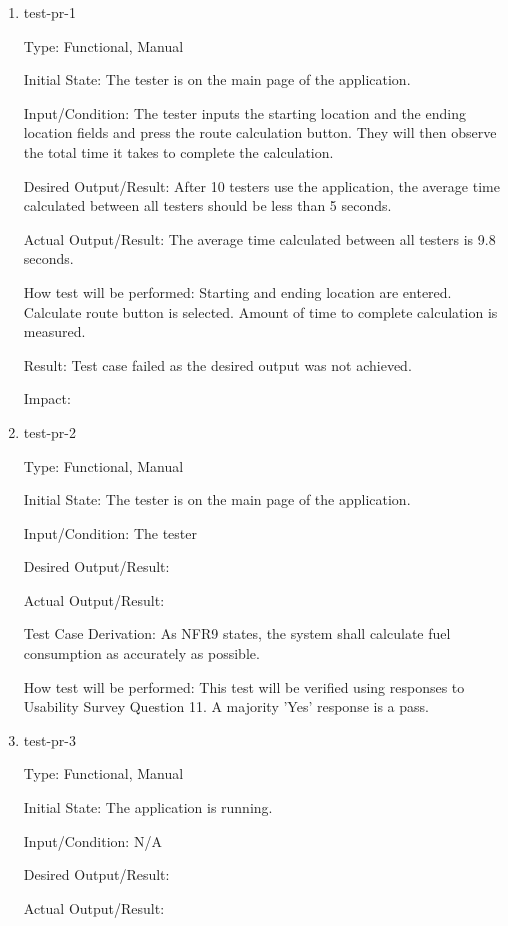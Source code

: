 \documentclass[12pt, titlepage]{article}
\begin{document}
\begin{enumerate}

\item{test-pr-1\\}

Type: Functional, Manual

Initial State: The tester is on the main page of the application.

Input/Condition: The tester inputs the starting location and the ending location fields and press the route calculation button. They will then observe the total time it takes to complete the calculation.

Desired Output/Result: After 10 testers use the application, the average time calculated between all testers should be less than 5 seconds.

Actual Output/Result: The average time calculated between all testers is 9.8 seconds.

How test will be performed: Starting and ending location are entered. Calculate route button is selected. Amount of time to complete calculation is measured. 

Result: Test case failed as the desired output was not achieved.

Impact: 

\item{test-pr-2\\}

Type: Functional, Manual

Initial State: The tester is on the main page of the application.

Input/Condition: The tester 

Desired Output/Result: 

Actual Output/Result:

Test Case Derivation: As NFR9 states, the system shall calculate fuel consumption as accurately as possible.

How test will be performed: This test will be verified using responses to Usability Survey Question 11. A majority 'Yes' response is a pass.

\item{test-pr-3\\}

Type: Functional, Manual

Initial State: The application is running. 

Input/Condition: N/A

Desired Output/Result: 

Actual Output/Result:


\end{enumerate}
\end{document}

